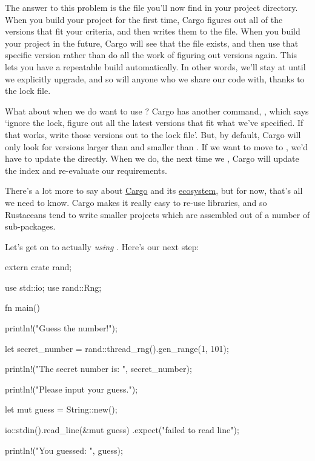 \blank

The answer to this problem is the  file you’ll now find in your project directory. When you build your project 
for the first time, Cargo figures out all of the versions that fit your criteria, and then writes them to the 
file. When you build your project in the future, Cargo will see that the  file exists, and then use that specific
version rather than do all the work of figuring out versions again. This lets you have a repeatable build automatically. In other
words, we’ll stay at  until we explicitly upgrade, and so will anyone who we share our code with, thanks to the lock 
file.

\blank

What about when we do want to use ? Cargo has another command, , which says ‘ignore the lock, figure out
all the latest versions that fit what we’ve specified. If that works, write those versions out to the lock file’. But, by default,
Cargo will only look for versions larger than  and smaller than . If we want to move to , we’d
have to update the  directly. When we do, the next time we , Cargo will update the index and 
re-evaluate our  requirements.

\blank

There’s a lot more to say about \href{http://doc.crates.io/}{Cargo} and its \href{http://doc.crates.io/crates-io.html}{ecosystem},
but for now, that’s all we need to know. Cargo makes it really easy to re-use libraries, and so Rustaceans tend to write smaller
projects which are assembled out of a number of sub-packages.

\blank

Let’s get on to actually \emph{using} . Here’s our next step:

\begin{rustc}
extern crate rand;

use std::io;
use rand::Rng;

fn main() {
    println!("Guess the number!");

    let secret_number = rand::thread_rng().gen_range(1, 101);

    println!("The secret number is: {}", secret_number);

    println!("Please input your guess.");

    let mut guess = String::new();

    io::stdin().read_line(&mut guess)
        .expect("failed to read line");

    println!("You guessed: {}", guess);
}
\end{rustc}

